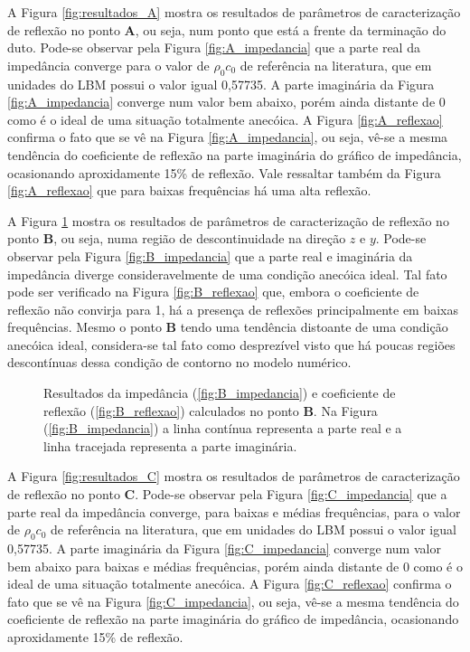 \newpage
A Figura \ref{fig:resultados_A} mostra os resultados de parâmetros de caracterização de reflexão no ponto \textbf{A}, ou seja, num ponto que está a frente da terminação do duto. Pode-se observar pela Figura \ref{fig:A_impedancia} que a parte real da impedância converge para o valor de $\rho_{0} c_{0}$ de referência na literatura, que em unidades do LBM possui o valor igual 0,57735. A parte imaginária da Figura \ref{fig:A_impedancia} converge num valor bem abaixo, porém ainda distante de 0 como é o ideal de uma situação totalmente anecóica. A Figura \ref{fig:A_reflexao} confirma o fato que se vê na Figura \ref{fig:A_impedancia}, ou seja, vê-se a mesma tendência do coeficiente de reflexão na parte imaginária do gráfico de impedância, ocasionando aproxidamente 15\% de reflexão. Vale ressaltar também da Figura \ref{fig:A_reflexao} que para baixas frequências há uma alta reflexão. 

A Figura \ref{fig:resultados_B} mostra os resultados de parâmetros de caracterização de reflexão no ponto \textbf{B}, ou seja, numa região de descontinuidade na direção $z$ e $y$. Pode-se observar pela Figura \ref{fig:B_impedancia} que a parte real e imaginária da impedância diverge consideravelmente de uma condição anecóica ideal. Tal fato pode ser verificado na Figura \ref{fig:B_reflexao} que, embora o coeficiente de reflexão não convirja para 1, há a presença de reflexões principalmente em baixas frequências. Mesmo o ponto \textbf{B} tendo uma tendência distoante de uma condição anecóica ideal, considera-se tal fato como desprezível visto que há poucas regiões descontínuas dessa condição de contorno no modelo numérico.   

\begin{figure}
\begin{subfigure}{\scaleA \textwidth}
  
\end{subfigure}%
\begin{subfigure}{\scaleA \textwidth}
  
\end{subfigure}
\caption{Resultados da impedância (\ref{fig:B_impedancia}) e coeficiente de reflexão (\ref{fig:B_reflexao}) calculados no ponto $\textbf{B}$. Na Figura (\ref{fig:B_impedancia}) a linha contínua representa a parte real e a linha tracejada representa a parte imaginária.}
\label{fig:resultados_B}
\end{figure}

\newpage
A Figura \ref{fig:resultados_C} mostra os resultados de parâmetros de caracterização de reflexão no ponto \textbf{C}. Pode-se observar pela Figura \ref{fig:C_impedancia} que a parte real da impedância converge, para baixas e médias frequências, para o valor de $\rho_{0} c_{0}$ de referência na literatura, que em unidades do LBM possui o valor igual 0,57735. A parte imaginária da Figura \ref{fig:C_impedancia} converge num valor bem abaixo para baixas e médias frequências, porém ainda distante de 0 como é o ideal de uma situação totalmente anecóica. A Figura \ref{fig:C_reflexao} confirma o fato que se vê na Figura \ref{fig:C_impedancia}, ou seja, vê-se a mesma tendência do coeficiente de reflexão na parte imaginária do gráfico de impedância, ocasionando aproxidamente 15\% de reflexão.

